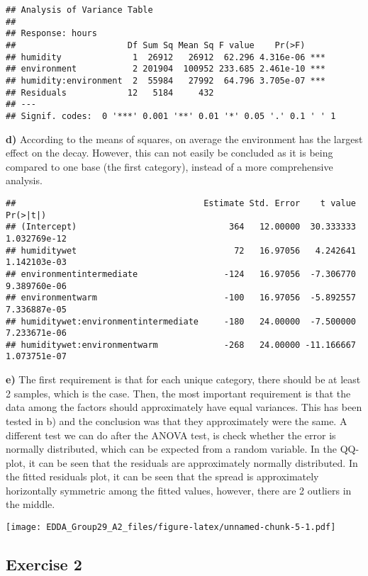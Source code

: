 \documentclass[]{article}
\begin{document}
\begin{verbatim}
## Analysis of Variance Table
## 
## Response: hours
##                      Df Sum Sq Mean Sq F value    Pr(>F)    
## humidity              1  26912   26912  62.296 4.316e-06 ***
## environment           2 201904  100952 233.685 2.461e-10 ***
## humidity:environment  2  55984   27992  64.796 3.705e-07 ***
## Residuals            12   5184     432                      
## ---
## Signif. codes:  0 '***' 0.001 '**' 0.01 '*' 0.05 '.' 0.1 ' ' 1
\end{verbatim}

\textbf{d)} According to the means of squares, on average the
environment has the largest effect on the decay. However, this can not
easily be concluded as it is being compared to one base (the first
category), instead of a more comprehensive analysis.

\begin{verbatim}
##                                     Estimate Std. Error    t value     Pr(>|t|)
## (Intercept)                              364   12.00000  30.333333 1.032769e-12
## humiditywet                               72   16.97056   4.242641 1.142103e-03
## environmentintermediate                 -124   16.97056  -7.306770 9.389760e-06
## environmentwarm                         -100   16.97056  -5.892557 7.336887e-05
## humiditywet:environmentintermediate     -180   24.00000  -7.500000 7.233671e-06
## humiditywet:environmentwarm             -268   24.00000 -11.166667 1.073751e-07
\end{verbatim}

\textbf{e)} The first requirement is that for each unique category,
there should be at least 2 samples, which is the case. Then, the most
important requirement is that the data among the factors should
approximately have equal variances. This has been tested in b) and the
conclusion was that they approximately were the same. A different test
we can do after the ANOVA test, is check whether the error is normally
distributed, which can be expected from a random variable. In the
QQ-plot, it can be seen that the residuals are approximately normally
distributed. In the fitted residuals plot, it can be seen that the
spread is approximately horizontally symmetric among the fitted values,
however, there are 2 outliers in the middle.

\texttt{[image: EDDA\_Group29\_A2\_files/figure-latex/unnamed-chunk-5-1.pdf]}

\hypertarget{exercise-2}{%
\subsection{Exercise 2}\label{exercise-2}}
\end{document}
